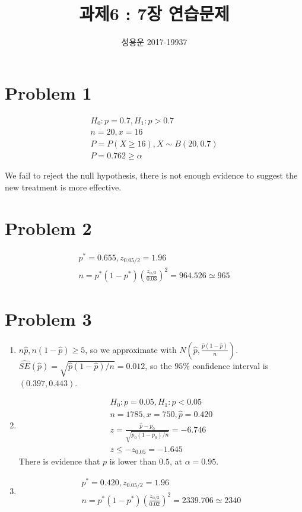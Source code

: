 \documentclass{article}
\title{과제6 : 7장 연습문제}
\author{성용운 2017-19937}
\date{}
\begin{document}
\maketitle

\section*{Problem 1}

\begin{gather*}
	H_0: p = 0.7, H_1: p > 0.7 \\
	n = 20, x = 16 \\
	P = P(X \ge 16), X \sim B(20, 0.7) \\
	P = 0.762 \ge \alpha
\end{gather*}

We fail to reject the null hypothesis, there is not enough evidence to suggest
the new treatment is more effective.

\section*{Problem 2}

\begin{gather*}
	p^* = 0.655, z_{0.05/2} = 1.96 \\
	n = p^* (1-p^*) \left(\frac{z_{\alpha/2}}{0.03}\right)^2 = 964.526
	\simeq 965
\end{gather*}

\section*{Problem 3}

\begin{enumerate}
	\item $n\widehat{p}, n(1-\widehat{p}) \ge 5$, so we approximate with
		$N(\widehat{p}, \frac{\widehat{p}(1-\widehat{p})}{n})$.
		$\widehat{SE}(\widehat{p}) = \sqrt{\widehat{p}(1-\widehat{p})/n} = 0.012$,
		so the $95\%$ confidence interval is $(0.397, 0.443)$.
	\item
		\begin{gather*}
			H_0: p = 0.05, H_1: p < 0.05 \\
			n = 1785, x = 750, \widehat{p} = 0.420 \\
			z = \frac{\widehat{p} - p_0}{\sqrt{p_0(1-p_0)/n}} = -6.746 \\
			z \le -z_{0.05} = -1.645
		\end{gather*}
		There is evidence that $p$ is lower than $0.5$, at $\alpha = 0.95$.
	\item
		\begin{gather*}
			p^* = 0.420, z_{0.05/2} = 1.96 \\
			n = p^* (1-p^*) \left(\frac{z_{\alpha/2}}{0.02}\right)^2 = 2339.706
			\simeq 2340
		\end{gather*}
\end{enumerate}
\end{document}
